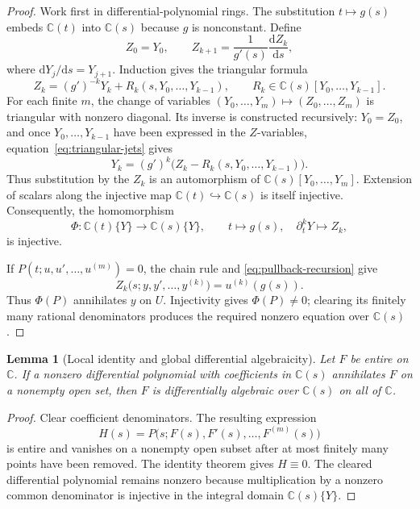 \documentclass[11pt]{article}
\numberwithin{equation}{section}
\newtheorem{lemma}[theorem]{Lemma}
\theoremstyle{definition}
\theoremstyle{remark}
\newcommand{\C}{\mathbb C}
\newcommand{\dd}{\mathrm d}
\begin{document}
\begin{proof}
Work first in differential-polynomial rings.  The substitution $t\mapsto g(s)$ embeds
$\C(t)$ into $\C(s)$ because $g$ is nonconstant.  Define
\begin{equation}
 Z_0=Y_0,
 \qquad
 Z_{k+1}=\frac{1}{g'(s)}\frac{\dd Z_k}{\dd s},
 \label{eq:pullback-recursion}
\end{equation}
where $\dd Y_j/\dd s=Y_{j+1}$.  Induction gives the triangular formula
\begin{equation}
 Z_k=(g')^{-k}Y_k+R_k(s,Y_0,\ldots,Y_{k-1}),
 \qquad R_k\in\C(s)[Y_0,\ldots,Y_{k-1}].
 \label{eq:triangular-jets}
\end{equation}
For each finite $m$, the change of variables
$(Y_0,\ldots,Y_m)\mapsto(Z_0,\ldots,Z_m)$ is triangular with nonzero diagonal.  Its inverse is
constructed recursively: $Y_0=Z_0$, and once $Y_0,\ldots,Y_{k-1}$ have been expressed in the
$Z$-variables, equation~\eqref{eq:triangular-jets} gives
\[
 Y_k=(g')^k\bigl(Z_k-R_k(s,Y_0,\ldots,Y_{k-1})\bigr).
\]
Thus substitution by the $Z_k$ is an automorphism of
$\C(s)[Y_0,\ldots,Y_m]$.  Extension of scalars along the injective map
$\C(t)\hookrightarrow\C(s)$ is itself injective.  Consequently, the homomorphism
\[
 \Phi:\C(t)\{Y\}\longrightarrow\C(s)\{Y\},
 \qquad t\mapsto g(s),\quad \partial_t^kY\mapsto Z_k,
\]
is injective.

If $P(t;u,u',\ldots,u^{(m)})=0$, the chain rule and
\eqref{eq:pullback-recursion} give
\[
 Z_k\bigl(s;y,y',\ldots,y^{(k)}\bigr)=u^{(k)}(g(s)).
\]
Thus $\Phi(P)$ annihilates $y$ on $U$.  Injectivity gives $\Phi(P)\neq0$; clearing its finitely
many rational denominators produces the required nonzero equation over $\C(s)$.
\end{proof}

\begin{lemma}[Local identity and global differential algebraicity]
\label{lem:local-global}
Let $F$ be entire on $\C$.  If a nonzero differential polynomial with coefficients in $\C(s)$
annihilates $F$ on a nonempty open set, then $F$ is differentially algebraic over $\C(s)$ on all
of $\C$.
\end{lemma}

\begin{proof}
Clear coefficient denominators.  The resulting expression
\[
 H(s)=P\bigl(s;F(s),F'(s),\ldots,F^{(m)}(s)\bigr)
\]
is entire and vanishes on a nonempty open subset after at most finitely many points have been
removed.  The identity theorem gives $H\equiv0$.  The cleared
differential polynomial remains nonzero because multiplication by a nonzero common denominator is
injective in the integral domain $\C(s)\{Y\}$.
\end{proof}
\end{document}
